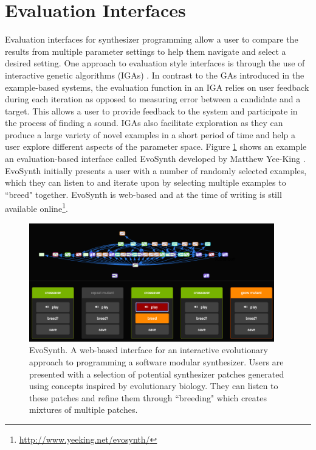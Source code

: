 \section{Evaluation Interfaces}
Evaluation interfaces for synthesizer programming allow a user to compare the results from multiple parameter settings to help them navigate and select a desired setting. One approach to evaluation style interfaces is through the use of interactive genetic algorithms (IGAs) \cite{johnson1999exploring, dahlstedt2001creating, yee2016use}. In contrast to the GAs introduced in the example-based systems, the evaluation function in an IGA relies on user feedback during each iteration as opposed to measuring error between a candidate and a target. This allows a user to provide feedback to the system and participate in the process of finding a sound. IGAs also facilitate exploration as they can produce a large variety of novel examples in a short period of time and help a user explore different aspects of the parameter space. Figure \ref{fig:evosynth} shows an example an evaluation-based interface called EvoSynth developed by Matthew Yee-King \cite{yee2016use}. EvoSynth initially presents a user with a number of randomly selected examples, which they can listen to and iterate upon by selecting multiple examples to ``breed" together. EvoSynth is web-based and at the time of writing is still available online\footnote{\url{http://www.yeeking.net/evosynth/}}.

\begin{figure}[ht]
    \centering
    \includegraphics[width=0.95\textwidth]{figures/background/EvoSynth.png}
    \caption{EvoSynth. A web-based interface for an interactive evolutionary approach to programming a software modular synthesizer. Users are presented with a selection of potential synthesizer patches generated using concepts inspired by evolutionary biology. They can listen to these patches and refine them through ``breeding" which creates mixtures of multiple patches.}
    \label{fig:evosynth}
\end{figure}

